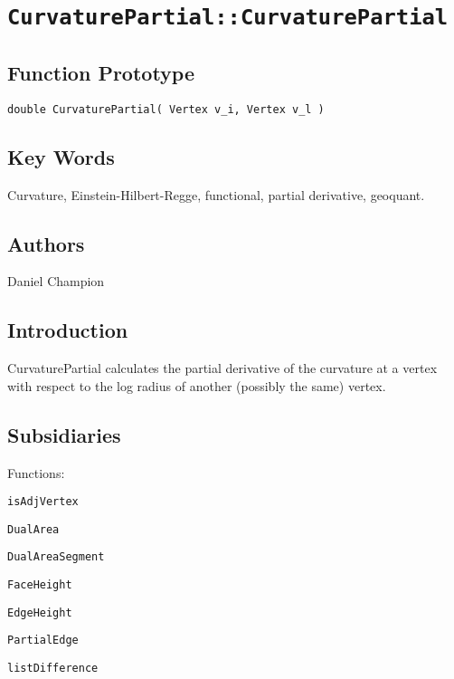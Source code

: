                       

\section*{\texttt{CurvaturePartial::CurvaturePartial}}

\subsection*{Function Prototype}

\texttt{double CurvaturePartial( Vertex v\_i, Vertex v\_l )}

\subsection*{Key Words}

Curvature, Einstein-Hilbert-Regge, functional, partial derivative, geoquant.

\subsection*{Authors}

Daniel Champion

\subsection*{Introduction}

CurvaturePartial calculates the partial derivative of the curvature at a
vertex with respect to the log radius of another (possibly the same) vertex.
\ 

\subsection*{Subsidiaries}

Functions:

\qquad\texttt{isAdjVertex}

\qquad \texttt{DualArea}

\qquad \qquad \texttt{DualAreaSegment}

\qquad \qquad \qquad \texttt{FaceHeight}

\qquad \qquad \qquad \qquad \texttt{EdgeHeight}

\qquad \qquad \qquad \qquad \qquad \texttt{PartialEdge}

\qquad\texttt{listDifference}

